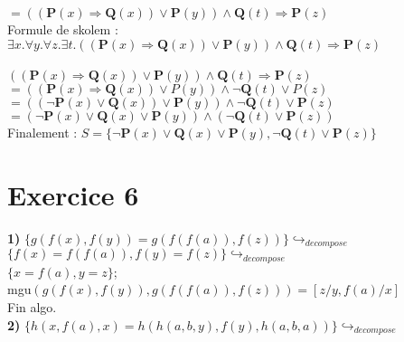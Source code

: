 \documentclass{article}
\begin{document}
$= ((\textbf{P}(x) \Rightarrow \textbf{Q}(x)) \lor \textbf{P}(y)) \land \textbf{Q}(t) \Rightarrow \textbf{P}(z)$\\

Formule de skolem : $\exists x.\forall y.\forall z.\exists t.((\textbf{P}(x) \Rightarrow \textbf{Q}(x)) \lor \textbf{P}(y)) \land \textbf{Q}(t) \Rightarrow \textbf{P}(z)$\\

\\

$((\textbf{P}(x) \Rightarrow \textbf{Q}(x)) \lor \textbf{P}(y)) \land \textbf{Q}(t) \Rightarrow \textbf{P}(z)$\\

$= ((\textbf{P}(x) \Rightarrow \textbf{Q}(x)) \lor P(y)) \land \neg \textbf{Q}(t) \lor P(z)$\\

$= ((\neg \textbf{P}(x) \lor \textbf{Q}(x)) \lor \textbf{P}(y)) \land \neg \textbf{Q}(t) \lor \textbf{P}(z)$\\

$= (\neg \textbf{P}(x) \lor \textbf{Q}(x) \lor \textbf{P}(y)) \land (\neg \textbf{Q}(t) \lor \textbf{P}(z))$\\

Finalement : $S = \{\neg \textbf{P}(x) \lor \textbf{Q}(x) \lor \textbf{P}(y), \neg \textbf{Q}(t) \lor \textbf{P}(z)\}$\\









\section*{Exercice 6}

\textbf{1)} $\{g(f(x),f(y)) = g(f(f(a)),f(z))\} \hookrightarrow_{decompose}$\\

$\{f(x)=f(f(a)), f(y)=f(z)\} \hookrightarrow_{decompose}$\\

$\{x=f(a), y=z\}$;\\

mgu$(g(f(x),f(y)),g(f(f(a)),f(z))) = [z/y,f(a)/x]$\\

Fin algo.\\

\textbf{2)} $\{h(x,f(a),x) = h(h(a,b,y),f(y),h(a,b,a))\} \hookrightarrow_{decompose}$\\
\end{document}
